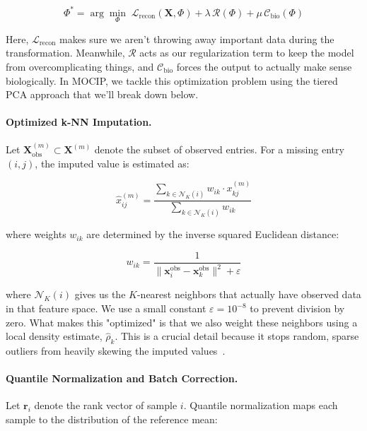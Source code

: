 \documentclass[12pt,a4paper,onecolumn]{article}
\begin{document}
\begin{equation}
\Phi^{*} = \arg\min_{\Phi} \; \mathcal{L}_{\text{recon}}(\mathbf{X}, \Phi) + \lambda \, \mathcal{R}(\Phi) + \mu \, \mathcal{C}_{\text{bio}}(\Phi)
\end{equation}

Here, $\mathcal{L}_{\text{recon}}$ makes sure we aren't throwing away important data during the transformation. Meanwhile, $\mathcal{R}$ acts as our regularization term to keep the model from overcomplicating things, and $\mathcal{C}_{\text{bio}}$ forces the output to actually make sense biologically. In MOCIP, we tackle this optimization problem using the tiered PCA approach that we'll break down below.

\paragraph{Optimized k-NN Imputation.}
Let $\mathbf{X}^{(m)}_{\text{obs}} \subset \mathbf{X}^{(m)}$ denote the subset of observed entries. For a missing entry $(i, j)$, the imputed value is estimated as:

\begin{equation}
\hat{x}^{(m)}_{ij} = \frac{\sum_{k \in \mathcal{N}_K(i)} w_{ik} \cdot x^{(m)}_{kj}}{\sum_{k \in \mathcal{N}_K(i)} w_{ik}}
\end{equation}

where weights $w_{ik}$ are determined by the inverse squared Euclidean distance:

\begin{equation}
w_{ik} = \frac{1}{\|\mathbf{x}_i^{\text{obs}} - \mathbf{x}_k^{\text{obs}}\|^2 + \varepsilon}
\end{equation}

where $\mathcal{N}_K(i)$ gives us the $K$-nearest neighbors that actually have observed data in that feature space. We use a small constant $\varepsilon = 10^{-8}$ to prevent division by zero. What makes this "optimized" is that we also weight these neighbors using a local density estimate, $\hat{\rho}_k$. This is a crucial detail because it stops random, sparse outliers from heavily skewing the imputed values~\cite{troyanskaya2001}.

\paragraph{Quantile Normalization and Batch Correction.}
Let $\mathbf{r}_i$ denote the rank vector of sample $i$. Quantile normalization maps each sample to the distribution of the reference mean:
\end{document}
